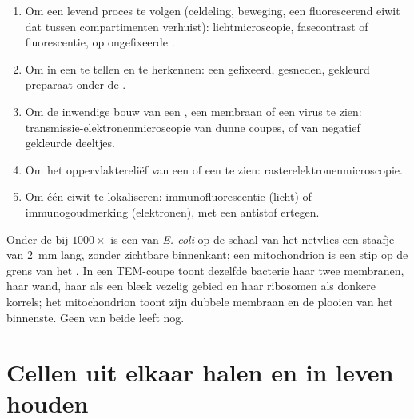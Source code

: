 \begin{method}\label{met:b1:cell-unit-of-life:choose}
\begin{enumerate}
  \item Om een levend proces te volgen (celdeling, beweging, een
        fluorescerend eiwit dat tussen compartimenten verhuist):
        lichtmicroscopie, fasecontrast of fluorescentie, op ongefixeerde
        .
  \item Om  in een  te tellen en te herkennen: een
        gefixeerd, gesneden, gekleurd preparaat onder de .
  \item Om de inwendige bouw van een , een membraan of een virus
        te zien: transmissie-elektronenmicroscopie van dunne coupes, of
        van negatief gekleurde deeltjes.
  \item Om het oppervlaktereliëf van een  of een  te zien:
        raster\-elektronenmicroscopie.
  \item Om één eiwit te lokaliseren: immunofluorescentie (licht) of
        immunogoudmerking (elektronen), met een antistof ertegen.
\end{enumerate}
\end{method}

\begin{example}\label{ex:b1:cell-unit-of-life:seeing}
Onder de  bij $1000\times$ is een  van \emph{E. coli} op de
schaal van het netvlies een staafje van \qty{2}{mm} lang, zonder zichtbare
binnenkant; een mitochondrion is een stip op de grens van het . In een TEM-coupe toont dezelfde bacterie haar twee membranen, haar
wand, haar  als een bleek vezelig gebied en haar ribosomen als donkere
korrels; het mitochondrion toont zijn dubbele membraan en de plooien van het
binnenste. Geen van beide leeft nog.
\end{example}

\section{Cellen uit elkaar halen en in leven houden}

